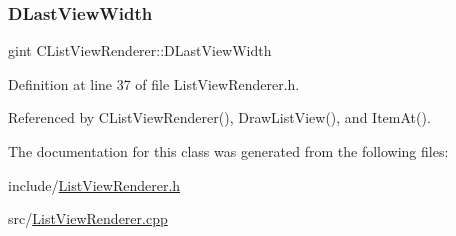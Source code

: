 \subsubsection{\texorpdfstring{D\+Last\+View\+Width}{DLastViewWidth}}
{\footnotesize\ttfamily gint C\+List\+View\+Renderer\+::\+D\+Last\+View\+Width\hspace{0.3cm}{\ttfamily [protected]}}



Definition at line 37 of file List\+View\+Renderer.\+h.



Referenced by C\+List\+View\+Renderer(), Draw\+List\+View(), and Item\+At().



The documentation for this class was generated from the following files\+:\begin{DoxyCompactItemize}
\item 
include/\hyperlink{ListViewRenderer_8h}{List\+View\+Renderer.\+h}\item 
src/\hyperlink{ListViewRenderer_8cpp}{List\+View\+Renderer.\+cpp}\end{DoxyCompactItemize}
